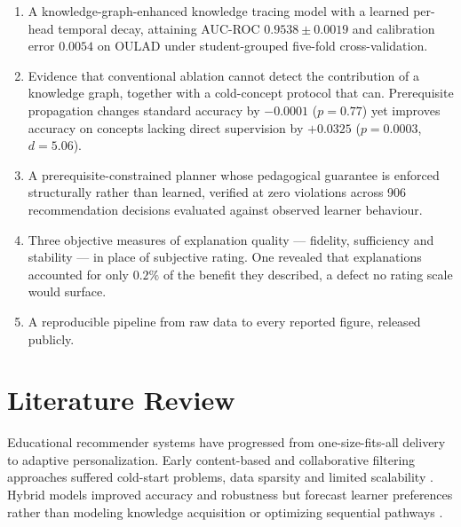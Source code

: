 \begin{enumerate}
\item A knowledge-graph-enhanced knowledge tracing model with a learned per-head temporal
decay, attaining AUC-ROC $0.9538 \pm 0.0019$ and calibration error $0.0054$ on OULAD under
student-grouped five-fold cross-validation.

\item Evidence that conventional ablation cannot detect the contribution of a knowledge
graph, together with a cold-concept protocol that can. Prerequisite propagation changes
standard accuracy by $-0.0001$ ($p = 0.77$) yet improves accuracy on concepts lacking
direct supervision by $+0.0325$ ($p = 0.0003$, $d = 5.06$).

\item A prerequisite-constrained planner whose pedagogical guarantee is enforced
structurally rather than learned, verified at zero violations across 906 recommendation
decisions evaluated against observed learner behaviour.

\item Three objective measures of explanation quality --- fidelity, sufficiency and
stability --- in place of subjective rating. One revealed that explanations accounted for
only $0.2\%$ of the benefit they described, a defect no rating scale would surface.

\item A reproducible pipeline from raw data to every reported figure, released publicly.
\end{enumerate}

\section{Literature Review}
\label{sec:lit}

Educational recommender systems have progressed from one-size-fits-all delivery to
adaptive personalization. Early content-based and collaborative filtering approaches
suffered cold-start problems, data sparsity and limited scalability
\cite{li2026survey}\cite{aher2013combination}. Hybrid models improved accuracy and
robustness \cite{kuzilek2017oulad} but forecast learner preferences rather than modeling
knowledge acquisition or optimizing sequential pathways \cite{corbett1994knowledge}.

